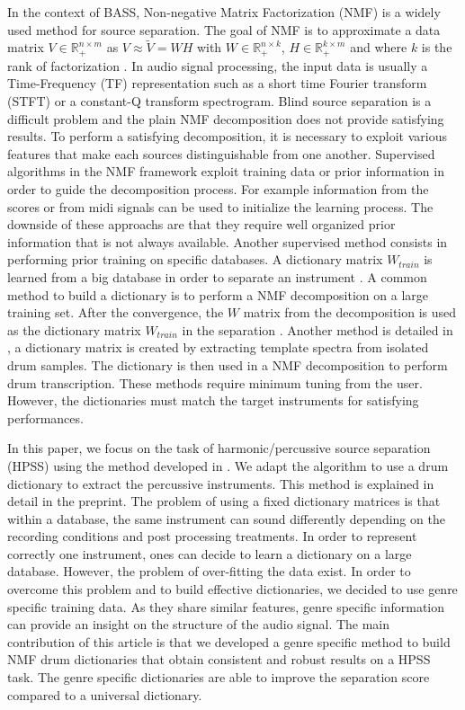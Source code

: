 \documentclass{article}
\begin{document}
In the context of BASS, Non-negative Matrix Factorization (NMF) is a widely used method for source separation. The goal of NMF is to approximate a data matrix $V \in \mathbb{R}_{+}^{n \times m} $ as $V \approx \tilde{V} = WH$ with $W \in \mathbb{R}_{+}^{n \times k}$, $H \in \mathbb{R}_{+}^{k \times m}$ and where $k$ is the rank of factorization \cite{lee99}. In audio signal processing, the input data is usually a Time-Frequency (TF) representation such as a short time Fourier transform (STFT) or a constant-Q transform spectrogram. Blind source separation is a difficult problem and the plain NMF decomposition does not provide satisfying results. To perform a satisfying decomposition, it is necessary to exploit various features that make each sources distinguishable from one another. 
Supervised algorithms in the NMF framework exploit training data or prior information in order to guide the decomposition process. For example information from the scores or from midi signals \cite{EwertM12} can be used to initialize the learning process. The downside of these approachs are that they require well organized prior information that is not always available. Another supervised method consists in performing prior training on specific databases. A dictionary matrix $W_{train}$ is learned from a big database in order to separate an instrument \cite{jaureguiberry2011adaptation,wudrum}. A common method to build a dictionary is to perform a NMF decomposition on a large training set. After the convergence, the $W$ matrix from the decomposition is used as the dictionary matrix $W_{train}$ in the separation \cite{jaureguiberry2011adaptation}. Another method is detailed in \cite{wudrum}, a dictionary matrix is created by extracting template spectra from isolated drum samples. The dictionary is then used in a NMF decomposition to perform drum transcription. These methods require minimum tuning from the user. However, the dictionaries must match the target instruments for satisfying performances. 

In this paper, we focus on the task of harmonic/percussive source separation (HPSS) using the method developed in \cite{laroche2015structured}. We adapt the algorithm to use a drum dictionary to extract the percussive instruments. This method is explained in detail in the preprint. 
The problem of using a fixed dictionary matrices is that within a database, the same instrument can sound differently depending on the recording conditions and post processing treatments. In order to represent correctly one instrument, ones can decide to learn a dictionary on a large database. However, the problem of over-fitting the data exist. In order to overcome this problem and to build effective dictionaries, we decided to use genre specific training data. As they share similar features, genre specific information can provide an insight on the structure of the audio signal.
The main contribution of this article is that we developed a genre specific method to build NMF drum dictionaries that obtain consistent and robust results on a HPSS task. The genre specific dictionaries are able to improve the separation score compared to a universal dictionary. 
 
\end{document}
